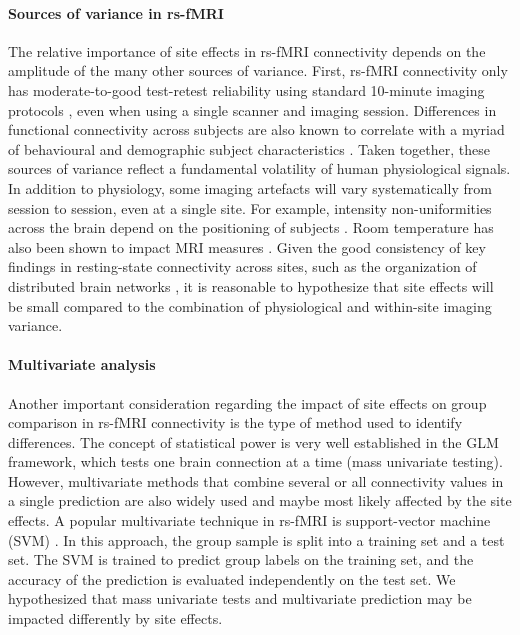 \documentclass[authoryear]{elsarticle}
\begin{document}
\paragraph{Sources of variance in rs-fMRI}
The relative importance of site effects in rs-fMRI connectivity depends on the amplitude of the many other sources of variance. First, rs-fMRI connectivity only has moderate-to-good test-retest reliability using standard 10-minute imaging protocols \citep{Shehzad2009}, even when using a single scanner and imaging session. Differences in functional connectivity across subjects are also known to correlate with a myriad of behavioural and demographic subject characteristics \citep{Anand2007,Sheline2010,Kilpatrick2006}. Taken together, these sources of variance reflect a fundamental volatility of human physiological signals. In addition to physiology, some imaging artefacts will vary systematically from session to session, even at a single site. For example, intensity non-uniformities across the brain depend on the positioning of subjects \citep{Caramanos2010}. Room temperature has also been shown to impact MRI measures \citep{Vanhoutte2006}. Given the good consistency of key findings in resting-state connectivity across sites, such as the organization of distributed brain networks \citep{Biswal2010}, it is reasonable to hypothesize that site effects will be small compared to the combination of physiological and within-site imaging variance.

\paragraph{Multivariate analysis}
Another important consideration regarding the impact of site effects on group comparison in rs-fMRI connectivity is the type of method used to identify differences. The concept of statistical power is very well established in the GLM framework, which tests one brain connection at a time (mass univariate testing). However, multivariate methods that combine several or all connectivity values in a single prediction are also widely used and maybe most likely affected by the site effects. A popular multivariate technique in rs-fMRI is support-vector machine (SVM) \citep{Cortes1995}. In this approach, the group sample is split into a training set and a test set. The SVM is trained to predict group labels on the training set, and the accuracy of the prediction is evaluated independently on the test set. We hypothesized that mass univariate tests and multivariate prediction may be impacted differently by site effects. 
\end{document}
